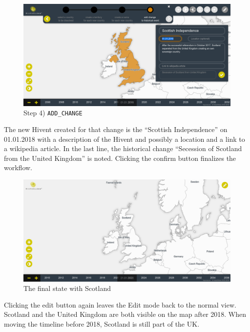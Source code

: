 
\vspace{1em}
\begin{minipage}[t]{0.47\textwidth}

  \begin{figure}[H]
    \centering
    \includegraphics[width=1.0\textwidth]{graphics/development/final_interface/7_add_change_to_hivent_2.png}
    \caption{Step 4) \texttt{ADD\_CHANGE}}
    \label{fig:final_7_add_change_to_hivent_2}
  \end{figure}

  The new Hivent created for that change is the ``Scottish Independence'' on 01.01.2018 with a description of the Hivent and possibly a location and a link to a wikipedia article. In the last line, the historical change ``Secession of Scotland from the United Kingdom'' is noted. Clicking the confirm button finalizes the workflow.

\end{minipage}    %
\hspace{1.5em}    %
\begin{minipage}[t]{0.47\textwidth}

  \begin{figure}[H]
    \centering
    \includegraphics[width=1.0\textwidth]{graphics/development/final_interface/8_final_state.png}
    \caption{The final state with Scotland}
    \label{fig:final_8_final_state}
  \end{figure}

  Clicking the edit button again leaves the Edit mode back to the normal view. Scotland and the United Kingdom are both visible on the map after 2018. When moving the timeline before 2018, Scotland is still part of the UK.

\end{minipage}


